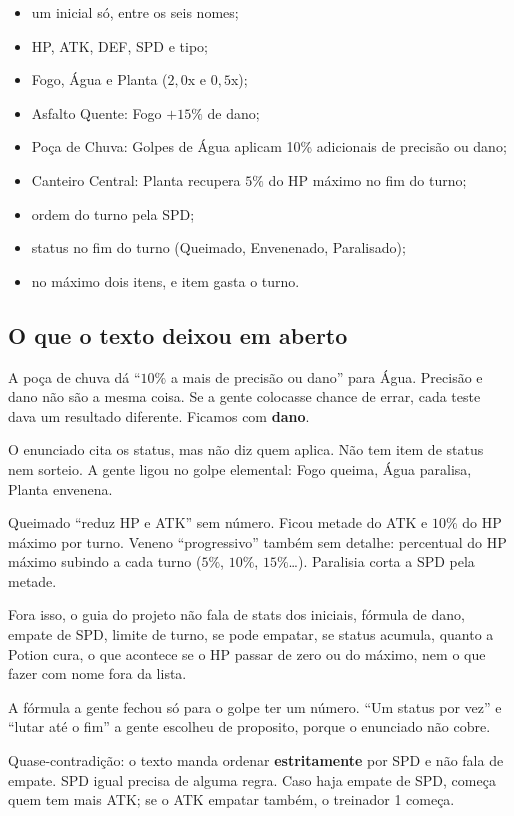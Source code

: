 \documentclass[12pt,oneside,a4paper,article]{abntex2}
\begin{document}
\begin{itemize}
  \item um inicial só, entre os seis nomes;
  \item HP, ATK, DEF, SPD e tipo;
  \item Fogo, Água e Planta ($2{,}0$x e $0{,}5$x);
  \item Asfalto Quente: Fogo $+15\%$ de dano;
  \item Poça de Chuva: Golpes de Água aplicam 10\% adicionais de precisão ou dano;
  \item Canteiro Central: Planta recupera $5\%$ do HP máximo no fim do turno;
  \item ordem do turno pela SPD;
  \item status no fim do turno (Queimado, Envenenado, Paralisado);
  \item no máximo dois itens, e item gasta o turno.
\end{itemize}

\subsection{O que o texto deixou em aberto}

A poça de chuva dá ``$10\%$ a mais de precisão ou dano'' para Água. Precisão e
dano não são a mesma coisa. Se a gente colocasse chance de errar, cada teste
dava um resultado diferente. Ficamos com \textbf{dano}.

O enunciado cita os status, mas não diz quem aplica. Não tem item de status
nem sorteio. A gente ligou no golpe elemental: Fogo queima, Água paralisa,
Planta envenena.

Queimado ``reduz HP e ATK'' sem número. Ficou metade do ATK e $10\%$ do HP
máximo por turno. Veneno ``progressivo'' também sem detalhe: percentual do
HP máximo subindo a cada turno ($5\%$, $10\%$, $15\%$\ldots). Paralisia
corta a SPD pela metade.

Fora isso, o guia do projeto não fala de stats dos iniciais, fórmula de dano, empate de
SPD, limite de turno, se pode empatar, se status acumula, quanto a Potion
cura, o que acontece se o HP passar de zero ou do máximo, nem o que fazer
com nome fora da lista.

A fórmula a gente fechou só para o golpe ter um número. ``Um status por vez'' e ``lutar até o fim'' a gente escolheu de
proposito, porque o enunciado não cobre.

Quase-contradição: o texto manda ordenar \textbf{estritamente} por SPD e não
fala de empate. SPD igual precisa de alguma regra. Caso haja empate de SPD, começa quem tem mais ATK; se o ATK empatar também, o treinador 1 começa.
\end{document}
